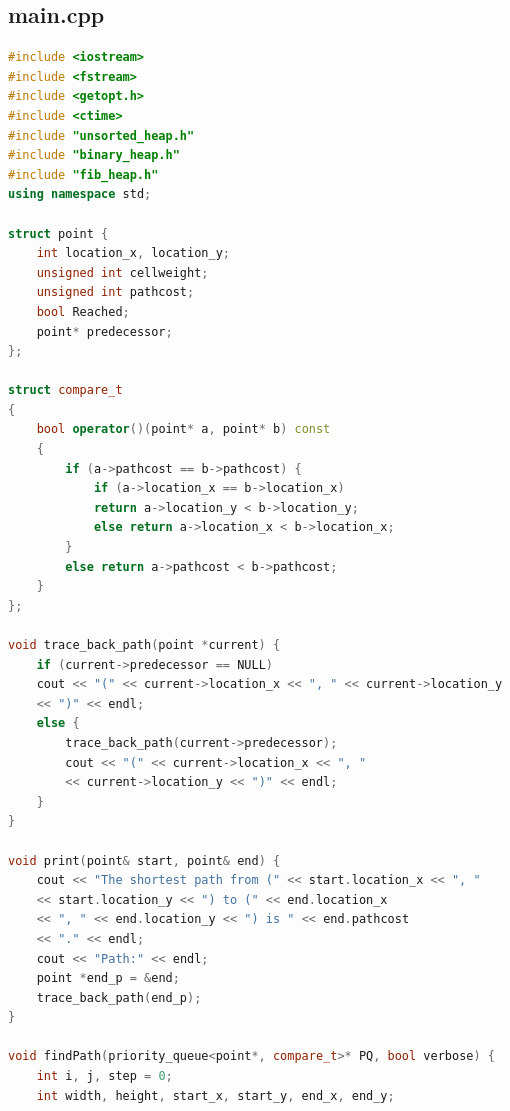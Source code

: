 \documentclass[a4paper]{article}
\begin{document}
\subsection{main.cpp}
\begin{lstlisting}[language=C++]
#include <iostream>
#include <fstream>
#include <getopt.h>
#include <ctime>
#include "unsorted_heap.h"
#include "binary_heap.h"
#include "fib_heap.h"
using namespace std;

struct point {
	int location_x, location_y;
	unsigned int cellweight;
	unsigned int pathcost;
	bool Reached;
	point* predecessor;
};

struct compare_t
{
	bool operator()(point* a, point* b) const
	{
		if (a->pathcost == b->pathcost) {
			if (a->location_x == b->location_x) 
			return a->location_y < b->location_y;
			else return a->location_x < b->location_x;
		}
		else return a->pathcost < b->pathcost;
	}
};

void trace_back_path(point *current) {
	if (current->predecessor == NULL) 
	cout << "(" << current->location_x << ", " << current->location_y 
	<< ")" << endl;
	else {
		trace_back_path(current->predecessor);
		cout << "(" << current->location_x << ", " 
		<< current->location_y << ")" << endl;
	}
}

void print(point& start, point& end) {
	cout << "The shortest path from (" << start.location_x << ", " 
	<< start.location_y << ") to (" << end.location_x 
	<< ", " << end.location_y << ") is " << end.pathcost 
	<< "." << endl;
	cout << "Path:" << endl;
	point *end_p = &end;
	trace_back_path(end_p);
}

void findPath(priority_queue<point*, compare_t>* PQ, bool verbose) {
	int i, j, step = 0;
	int width, height, start_x, start_y, end_x, end_y;


\end{lstlisting}
\end{document}
